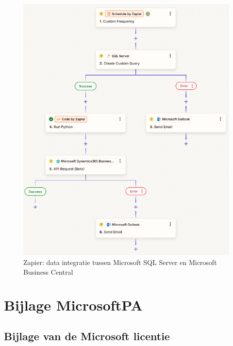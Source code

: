 \begin{figure}[H]
    \centering
    \includegraphics[]{../bachproef/images/Zapier_Database_BusinessCentral.png}
    \caption{Zapier: data integratie tussen Microsoft SQL Server en Microsoft Business Central}
\end{figure}

\section{Bijlage MicrosoftPA}
\label{ch:bijlageMicrosoft}

\subsection{Bijlage van de Microsoft licentie}
\label{ch:licentie}

